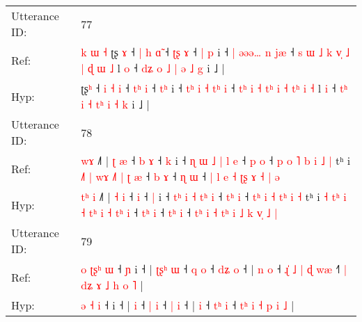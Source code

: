\documentclass[10pt]{article}
\DeclareRobustCommand{\hl}[1]{{\textcolor{red}{#1}}}
\begin{document}
\begin{longtable}{ll}
 \\
\midrule
Utterance ID: & 77 \\
Ref: & \hl{k}\hl{ }\hl{ɯ}\hl{ }\hl{˧}\hl{ }ʈʂ\hl{ }\hl{ɤ} ˧ \hl{|} \hl{h} \hl{ɑ}\hl{̃} ˧ \hl{ʈ}\hl{ʂ} \hl{ɤ} ˧ \hl{|}\hl{ }\hl{p} i ˧ \hl{|}\hl{ }\hl{ə}\hl{ə}\hl{ə}\hl{…} \hl{n}\hl{ }\hl{j}\hl{æ} ˧ \hl{s}\hl{ }\hl{ɯ} \hl{˩} \hl{k} \hl{v}\hl{̩} \hl{˩} \hl{|} \hl{}\hl{ɖ} \hl{ɯ} \hl{˩} l \hl{o} ˧ \hl{d}\hl{ʑ} \hl{o} \hl{˩} \hl{}\hl{|} \hl{ə} \hl{˩} \hl{g} i ˩ |
 \\
Hyp: & \hl{}\hl{}\hl{}\hl{}\hl{}\hl{}ʈʂ\hl{}\hl{ʰ} ˧ \hl{i} \hl{˧} \hl{}\hl{i} ˧ \hl{t}\hl{ʰ} \hl{i} ˧ \hl{}\hl{t}\hl{ʰ} i ˧ \hl{t}\hl{ʰ}\hl{ }\hl{i}\hl{ }\hl{˧} \hl{t}\hl{ʰ}\hl{ }\hl{i} ˧ \hl{}\hl{t}\hl{ʰ} \hl{i} \hl{˧} \hl{t}\hl{ʰ} \hl{i} \hl{˧} \hl{t}\hl{ʰ} \hl{i} \hl{˧} l \hl{i} ˧ \hl{t}\hl{ʰ} \hl{i} \hl{˧} \hl{t}\hl{ʰ} \hl{i} \hl{˧} \hl{k} i ˩ |
 \\
\midrule
Utterance ID: & 78 \\
Ref: & \hl{}\hl{}\hl{w}\hl{ɤ} ˩˥ | \hl{ʈ} \hl{æ} ˧\hl{ }\hl{b} \hl{ɤ} ˧ \hl{k} i ˧ \hl{}\hl{ɳ} \hl{ɯ} \hl{˩} \hl{|}\hl{ }\hl{l} \hl{e} ˧ \hl{}\hl{p} \hl{o} ˧ \hl{}\hl{p} \hl{o} \hl{˥} \hl{b}\hl{ }\hl{i} \hl{˩} \hl{|} tʰ i\hl{}\hl{} \hl{˩}\hl{˥} \hl{|} \hl{}\hl{w}\hl{ɤ}\hl{ }\hl{˩}\hl{˥} \hl{|} \hl{}\hl{ʈ} \hl{æ} ˧ \hl{}\hl{b} \hl{ɤ} ˧ \hl{}\hl{ɳ} \hl{ɯ} ˧ \hl{}\hl{|} \hl{l} \hl{e} \hl{}\hl{˧} \hl{}\hl{ʈ}\hl{ʂ} \hl{ɤ} \hl{}\hl{˧} \hl{|} \hl{ə}
 \\
Hyp: & \hl{t}\hl{ʰ}\hl{ }\hl{i} ˩˥ | \hl{˧} \hl{i} ˧\hl{}\hl{} \hl{i} ˧ \hl{|} i ˧ \hl{t}\hl{ʰ} \hl{i} \hl{˧} \hl{}\hl{t}\hl{ʰ} \hl{i} ˧ \hl{t}\hl{ʰ} \hl{i} ˧ \hl{t}\hl{ʰ} \hl{i} \hl{˧} \hl{}\hl{t}\hl{ʰ} \hl{i} \hl{˧} tʰ i\hl{ }\hl{˧} \hl{t}\hl{ʰ} \hl{i} \hl{˧}\hl{ }\hl{t}\hl{ʰ}\hl{ }\hl{i} \hl{˧} \hl{t}\hl{ʰ} \hl{i} ˧ \hl{t}\hl{ʰ} \hl{i} ˧ \hl{t}\hl{ʰ} \hl{i} ˧ \hl{t}\hl{ʰ} \hl{i} \hl{˧} \hl{t}\hl{ʰ} \hl{i}\hl{ }\hl{˩} \hl{k} \hl{v}\hl{̩} \hl{˩} \hl{|}
 \\
\midrule
Utterance ID: & 79 \\
Ref: & \hl{o} \hl{ʈ}\hl{ʂ}\hl{ʰ} \hl{ɯ} ˧\hl{ }\hl{ɲ} i ˧ |\hl{ }\hl{ʈ}\hl{ʂ}\hl{ʰ} \hl{ɯ} ˧ \hl{q} \hl{o} ˧ \hl{d}\hl{ʑ} \hl{o} ˧ |\hl{ }\hl{n} \hl{o} ˧\hl{ }\hl{ɻ}\hl{̍}\hl{ }\hl{˩} \hl{|}\hl{ }\hl{ɖ} \hl{w}\hl{æ} ˧\hl{˥}\hl{ }\hl{|} \hl{d}\hl{ʑ} \hl{ɤ} \hl{˩} \hl{h} \hl{o} \hl{˥} |
 \\
Hyp: & \hl{ə} \hl{}\hl{}\hl{˧} \hl{i} ˧\hl{}\hl{} i ˧ |\hl{}\hl{}\hl{}\hl{} \hl{i} ˧ \hl{|} \hl{i} ˧ \hl{}\hl{|} \hl{i} ˧ |\hl{}\hl{} \hl{i} ˧\hl{}\hl{}\hl{}\hl{}\hl{} \hl{}\hl{t}\hl{ʰ} \hl{}\hl{i} ˧\hl{}\hl{}\hl{} \hl{t}\hl{ʰ} \hl{i} \hl{˧} \hl{p} \hl{i} \hl{˩} |

\end{longtable}
\end{document}
